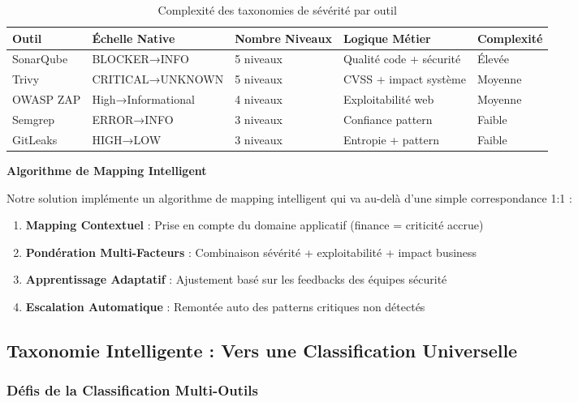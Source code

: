\documentclass[12pt,a4paper]{report}
\begin{document}
\begin{table}[H]
    \centering
    \begin{tabularx}{\textwidth}{|X|X|X|X|X|}
        \hline
        \textbf{Outil} & \textbf{Échelle Native} & \textbf{Nombre Niveaux} & \textbf{Logique Métier} & \textbf{Complexité} \\
        \hline
        SonarQube & BLOCKER→INFO & 5 niveaux & Qualité code + sécurité & Élevée \\
        \hline
        Trivy & CRITICAL→UNKNOWN & 5 niveaux & CVSS + impact système & Moyenne \\
        \hline
        OWASP ZAP & High→Informational & 4 niveaux & Exploitabilité web & Moyenne \\
        \hline
        Semgrep & ERROR→INFO & 3 niveaux & Confiance pattern & Faible \\
        \hline
        GitLeaks & HIGH→LOW & 3 niveaux & Entropie + pattern & Faible \\
        \hline
    \end{tabularx}
    \caption{Complexité des taxonomies de sévérité par outil}
\end{table}

\textbf{Algorithme de Mapping Intelligent}

Notre solution implémente un algorithme de mapping intelligent qui va au-delà d'une simple correspondance 1:1 :

\begin{enumerate}
    \item \textbf{Mapping Contextuel} : Prise en compte du domaine applicatif (finance = criticité accrue)
    \item \textbf{Pondération Multi-Facteurs} : Combinaison sévérité + exploitabilité + impact business
    \item \textbf{Apprentissage Adaptatif} : Ajustement basé sur les feedbacks des équipes sécurité
    \item \textbf{Escalation Automatique} : Remontée auto des patterns critiques non détectés
\end{enumerate}

\subsection{Taxonomie Intelligente : Vers une Classification Universelle}

\subsubsection{Défis de la Classification Multi-Outils}
\end{document}
